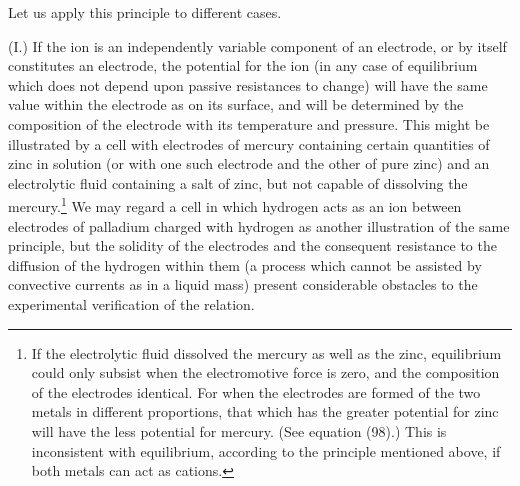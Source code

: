 \documentclass[12pt]{memoir}
\begin{document}
Let us apply this principle to different cases.

(I.) If the ion is an independently variable component of an electrode, or by itself constitutes an electrode, the potential for the ion (in any case of equilibrium which does not depend upon passive resistances to change) will have the same value within the electrode as on its surface, and will be determined by the composition of the electrode with its temperature and pressure. This might be illustrated by a cell with electrodes of mercury containing certain quantities of zinc in solution (or with one such electrode and the other of pure zinc) and an electrolytic fluid containing a salt of zinc, but not capable of dissolving the mercury.\footnote{If the electrolytic fluid dissolved the mercury as well as the zinc, equilibrium could only subsist when the electromotive force is zero, and the composition of the electrodes identical. For when the electrodes are formed of the two metals in different proportions, that which has the greater potential for zinc will have the less potential for mercury. (See equation (98).) This is inconsistent with equilibrium, according to the principle mentioned above, if both metals can act as cations.} We may regard a cell in which hydrogen acts as an ion between electrodes of palladium charged with hydrogen as another illustration of the same principle, but the solidity of the electrodes and the consequent resistance to the diffusion of the hydrogen within them (a process which cannot be assisted by convective currents as in a liquid mass) present considerable obstacles to the experimental verification of the relation.
\end{document}
